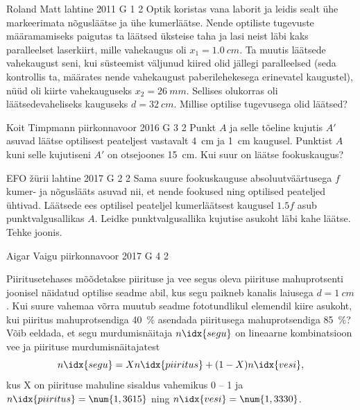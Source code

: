 \documentclass[11pt, twoside]{article}
\begin{document}
{%
{Roland Matt} %
{lahtine} %
{2011} %
{G 1} %
{2} %
{
\ifStatement
Optik koristas vana laborit ja leidis sealt ühe markeerimata nõgusläätse ja ühe
kumerläätse. Nende optiliste tugevuste määramamiseks paigutas ta läätsed
üksteise taha ja lasi neist läbi kaks paralleelset laserkiirt, mille vahekaugus
oli $x_{1}=\SI{1,0}{cm}$. Ta muutis läätsede vahekaugust seni, kui süsteemist väljunud
kiired olid jällegi paralleelsed (seda kontrollis ta, määrates nende vahekaugust
paberilehekesega erinevatel kaugustel), nüüd oli kiirte vahekauguseks
$x_{2}=\SI{26}{mm}$. Sellises olukorras oli läätsedevaheliseks kauguseks 
$d=\SI{32}{cm}$.
Millise optilise tugevusega olid läätsed?
\fi
}

{Koit Timpmann} %
{piirkonnavoor} %
{2016} %
{G 3} %
{2} %
{
\ifStatement
Punkt $A$ ja selle tõeline kujutis $A'$ asuvad läätse optilisest peateljest vastavalt \SI{4}{cm} ja \SI{1}{cm} kaugusel. Punktist $A$ kuni selle kujutiseni $A'$ on otsejoones \SI{15}{cm}. Kui suur on läätse fookuskaugus?
\fi
}

{EFO žürii} %
{lahtine} %
{2017} %
{G 2} %
{2} %
{
\ifStatement
Sama suure fookuskauguse absoluutväärtusega $f$ kumer- ja nõguslääts asuvad nii, et nende fookused ning optilised peateljed ühtivad. Läätsede ees optilisel peateljel kumerläätsest kaugusel $\num{1,5}f$ asub punktvalgusallikas $A$. Leidke punktvalgusallika kujutise asukoht läbi kahe läätse. Tehke joonis.
\fi
}

{Aigar Vaigu} %
{piirkonnavoor} %
{2017} %
{G 4} %
{2} %
{
\ifStatement
Piiritusetehases mõõdetakse piirituse ja vee segus oleva piirituse mahuprotsenti joonisel näidatud optilise seadme abil, kus segu paikneb kanalis laiusega $d=\SI{1}{cm}$. 
Kui suure vahemaa võrra muutub seadme fototundlikul elemendil kiire asukoht, kui piiritus mahuprotsendiga \SI{40}{\percent} asendada piiritusega mahuprotsendiga \SI{85}{\percent}?
Võib eeldada, et segu murdumisnäitaja $n\idx{segu}$ on lineaarne kombinatsioon vee ja piirituse murdumisnäitajatest
$$
n\idx{segu}=Xn\idx{piiritus}+(1-X)n\idx{vesi},
$$
kus X on piirituse mahuline sisaldus vahemikus 0 -- 1 ja $n\idx{piiritus}=\num{1,3615}$ ning $n\idx{vesi}=\num{1,3330}$.

}}
\end{document}
